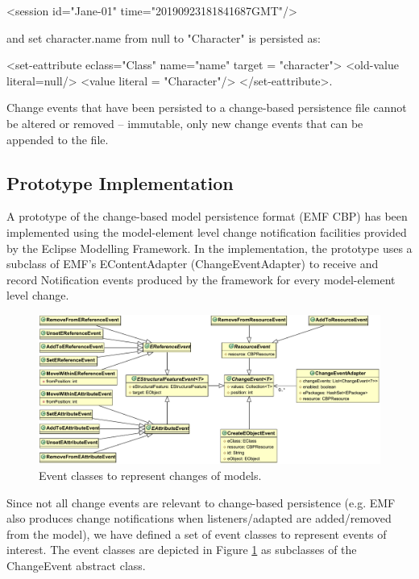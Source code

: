 \textsf{<session id="Jane-01" time="20190923181841687GMT"/>} 

and \textsf{set character.name from null to "Character"} is persisted as:

\textsf{<set-eattribute eclass="Class" name="name" 
target = "character">
<old-value literal=null/>
<value literal = "Character"/>
</set-eattribute>}.

Change events that have been persisted to a change-based persistence file cannot be altered or removed – immutable,  only new change events that can be appended to the file.

\subsection{Prototype Implementation}
\label{sec:prototype_implementation}

A prototype \cite{epsilonlabs2019emfcbp} of the change-based model persistence format (EMF CBP) has been implemented using the model-element level change notification facilities provided by the Eclipse Modelling Framework. In the implementation, the prototype uses a subclass of EMF's \textsf{EContentAdapter} (\textsf{ChangeEventAdapter}) to receive and record \textsf{Notification} events produced by the framework for every model-element level change.

\begin{figure}[th]
\centering
\includegraphics[width=\linewidth]{events}
\caption{Event classes to represent changes of models.}
\label{fig:events}
\end{figure}

Since not all change events are relevant to change-based persistence (e.g. EMF also produces change notifications when listeners/adapted are added/removed from the model), we have defined a set of event classes to represent events of interest. The event classes are depicted in Figure \ref{fig:events} as subclasses of the \textsf{ChangeEvent} abstract class.

